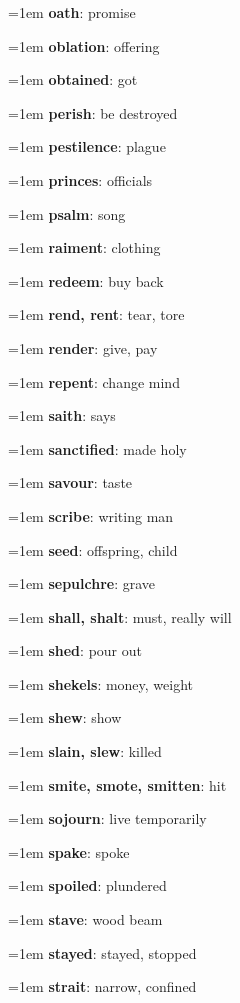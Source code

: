 {\begin{multicols}{3}
{\hangindent=1em \textbf{oath}: promise\par
\hangindent=1em \textbf{oblation}: offering\par
\hangindent=1em \textbf{obtained}: got\par
\hangindent=1em \textbf{perish}: be destroyed\par
\hangindent=1em \textbf{pestilence}: plague\par
\hangindent=1em \textbf{princes}: officials\par
\hangindent=1em \textbf{psalm}: song\par
\hangindent=1em \textbf{raiment}: clothing\par
\hangindent=1em \textbf{redeem}: buy back\par
\hangindent=1em \textbf{rend, rent}: tear, tore\par
\hangindent=1em \textbf{render}: give, pay\par
\hangindent=1em \textbf{repent}: change mind\par
\hangindent=1em \textbf{saith}: says\par
\hangindent=1em \textbf{sanctified}: made holy\par
\hangindent=1em \textbf{savour}: taste\par
\hangindent=1em \textbf{scribe}: writing man\par
\hangindent=1em \textbf{seed}: offspring, child\par
\hangindent=1em \textbf{sepulchre}: grave\par
\hangindent=1em \textbf{shall, shalt}: must, really will\par
\hangindent=1em \textbf{shed}: pour out\par
\hangindent=1em \textbf{shekels}: money, weight\par
\hangindent=1em \textbf{shew}: show\par
\hangindent=1em \textbf{slain, slew}: killed\par
\hangindent=1em \textbf{smite, smote, smitten}: hit\par
\hangindent=1em \textbf{sojourn}: live temporarily\par
\hangindent=1em \textbf{spake}: spoke\par
\hangindent=1em \textbf{spoiled}: plundered\par
\hangindent=1em \textbf{stave}: wood beam\par
\hangindent=1em \textbf{stayed}: stayed, stopped\par
\hangindent=1em \textbf{strait}: narrow, confined\par
}
\end{multicols}}
